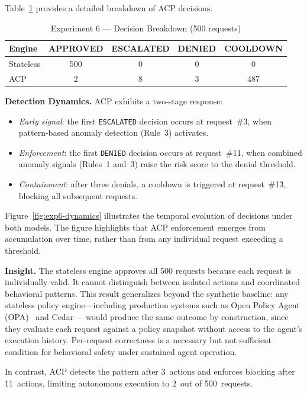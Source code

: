 \documentclass[11pt]{article}
\theoremstyle{definition}
\begin{document}
Table~\ref{tab:exp6-breakdown} provides a detailed breakdown of ACP decisions.

\begin{table}[h]
\centering
\caption{Experiment 6 --- Decision Breakdown (500 requests)}
\label{tab:exp6-breakdown}
\begin{tabular}{lcccc}
\toprule
Engine & APPROVED & ESCALATED & DENIED & COOLDOWN \\
\midrule
Stateless & 500 & 0 & 0 & 0   \\
ACP       & 2   & 8 & 3 & 487 \\
\bottomrule
\end{tabular}
\end{table}

\textbf{Detection Dynamics.}
ACP exhibits a two-stage response:
\begin{itemize}
    \item \textit{Early signal}: the first \texttt{ESCALATED} decision occurs at
    request~\#3, when pattern-based anomaly detection (Rule~3) activates.
    \item \textit{Enforcement}: the first \texttt{DENIED} decision occurs at
    request~\#11, when combined anomaly signals (Rules~1 and~3) raise the risk
    score to the denial threshold.
    \item \textit{Containment}: after three denials, a cooldown is triggered at
    request~\#13, blocking all subsequent requests.
\end{itemize}
Figure~\ref{fig:exp6-dynamics} illustrates the temporal evolution of decisions
under both models. The figure highlights that ACP enforcement emerges from
accumulation over time, rather than from any individual request exceeding a
threshold.

\textbf{Insight.}
The stateless engine approves all 500 requests because each request is
individually valid. It cannot distinguish between isolated actions and
coordinated behavioral patterns.
This result generalizes beyond the synthetic baseline: any stateless policy
engine---including production systems such as Open Policy Agent
(OPA)~\cite{opa} and Cedar~\cite{cedar}---would produce the same outcome by
construction, since they evaluate each request against a policy snapshot without
access to the agent's execution history.
Per-request correctness is a necessary but not sufficient condition for behavioral
safety under sustained agent operation.

In contrast, ACP detects the pattern after 3~actions and enforces blocking after
11~actions, limiting autonomous execution to 2~out of 500~requests.
\end{document}
